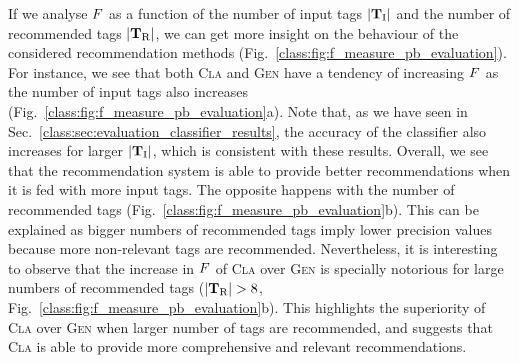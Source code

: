 If we analyse $F$ as a function of the number of input tags $|\mathbf{T}_{\text{I}}|$ and the number of recommended tags $|\mathbf{T}_{\text{R}}|$, we can get more insight on the behaviour of the considered recommendation methods (Fig.~\ref{class:fig:f_measure_pb_evaluation}). For instance, we see that both \textsc{Cla} and \textsc{Gen} have a tendency of increasing $F$ as the number of input tags also increases (Fig.~\ref{class:fig:f_measure_pb_evaluation}a).
Note that, as we have seen in Sec.~\ref{class:sec:evaluation_classifier_results}, the accuracy of the classifier also increases for larger $|\mathbf{T}_{\text{I}}|$, which is consistent with these results.
Overall, we see that the recommendation system is able to provide better recommendations when it is fed with more input tags. The opposite happens with the number of recommended tags (Fig.~\ref{class:fig:f_measure_pb_evaluation}b). This can be explained as bigger numbers of recommended tags imply lower precision values because more non-relevant tags are recommended. Nevertheless, it is interesting to observe that the increase in $F$ of \textsc{Cla} over \textsc{Gen} is specially notorious for large numbers of recommended tags ($\vert \mathbf{T}_{\text{R}} \vert > 8$, Fig.~\ref{class:fig:f_measure_pb_evaluation}b). 
This highlights the superiority of \textsc{Cla} over \textsc{Gen} when larger number of tags are recommended, and suggests that \textsc{Cla} is able to provide more comprehensive and relevant recommendations.

